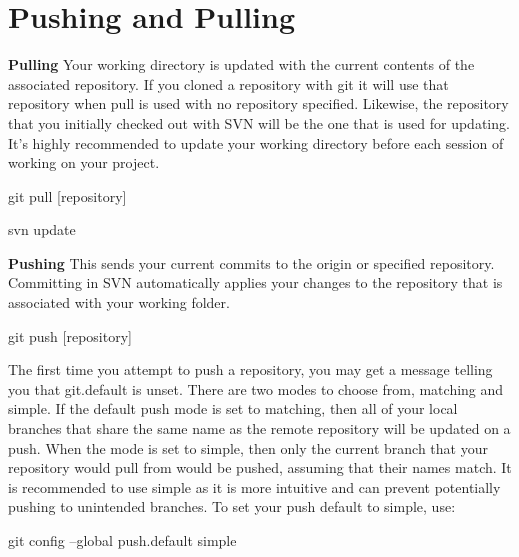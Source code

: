\documentclass[oneside]{book}
\begin{document}
\newpage
\section{Pushing and Pulling}
\textbf{Pulling} Your working directory is updated with the current contents of the associated repository. If you cloned a repository with git it will use that repository when pull is used with no repository specified. Likewise, the repository that you initially checked out with SVN will be the one that is used for updating. It's highly recommended to update your working directory before each session of working on your project. 
    \begin{gitcode}
    git pull [repository]
    \end{gitcode}
    \begin{svncode}
    svn update
    \end{svncode}
    
\textbf{Pushing} This sends your current commits to the origin or specified repository. Committing in SVN automatically applies your changes to the repository that is associated with your working folder.
    \begin{gitcode}
    git push [repository]
    \end{gitcode}
    
The first time you attempt to push a repository, you may get a message telling you that git.default is unset. There are two modes to choose from, matching and simple. If the default push mode is set to matching, then all of your local branches that share the same name as the remote repository will be updated on a push. When the mode is set to simple, then only the current branch that your repository would pull from would be pushed, assuming that their names match. It is recommended to use simple as it is more intuitive and can prevent potentially pushing to unintended branches. To set your push default to simple, use:
    \begin{gitcode}
    git config --global push.default simple
    \end{gitcode}
    

\newpage
\end{document}
